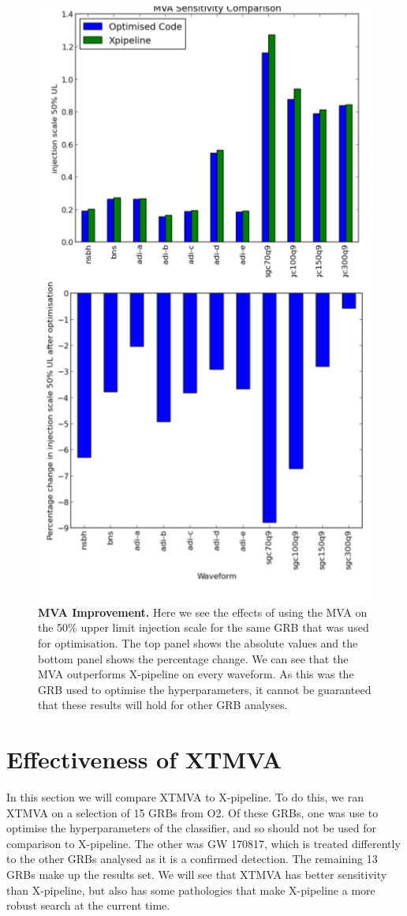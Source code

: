 \documentclass[11pt]{cuthesis}
\newcommand{\xp}{X-pipeline }
\newcommand{\xpc}{X-pipeline, }
\newcommand{\xpfs}{X-pipeline. }
\begin{document}
\begin{figure} %
\begin{center}
\includegraphics[width=0.8\linewidth]{x_compare.png}
\end{center}
\caption{\textbf{MVA Improvement.} Here we see the effects of using the MVA on the 50\% upper limit injection scale for the same GRB that was used for optimisation. The top panel shows the absolute values and the bottom panel shows the percentage change. We can see that the MVA outperforms \xp on every waveform. As this was the GRB used to optimise the hyperparameters, it cannot be guaranteed that these results will hold for other GRB analyses. }
\label{fig:x compare}
\end{figure}

\section{Effectiveness of XTMVA}
In this section we will compare XTMVA to \xpfs To do this, we ran XTMVA on a selection of 15 GRBs from O2. Of these GRBs, one was use to optimise the hyperparameters of the classifier, and so should not be used for comparison to \xpfs The other was GW 170817, which is treated differently to the other GRBs analysed as it is a confirmed detection. The remaining 13 GRBs make up the results set. We will see that XTMVA has better sensitivity than \xpc but also has some pathologies that make \xp a more robust search at the current time. 
\end{document}
